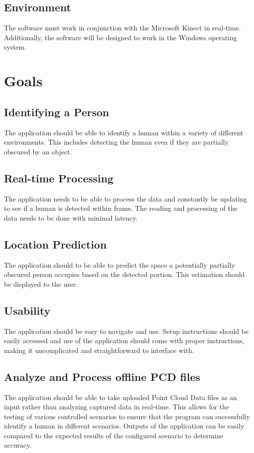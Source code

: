 \documentclass{article}
\begin{document}
\subsection{Environment}
The software must work in conjunction with the Microsoft Kinect in real-time. Additionally, the software will be designed to work in the Windows operating system.

\newpage
\section{Goals}   

\subsection{Identifying a Person}
The application should be able to identify a human within a variety of different environments. This includes detecting the human even if they are partially obscured by an object.

\subsection{Real-time Processing}
The application needs to be able to process the data and constantly be updating to see if a human is detected within frame. The reading and processing of the data needs to be done with minimal latency.

\subsection{Location Prediction}
The application should to be able to predict the space a potentially partially obscured person occupies based on the detected portion. This estimation should be displayed to the user.

\subsection{Usability}
The application should be easy to navigate and use. Setup instructions should be easily accessed and use of the application should come with proper instructions, making it uncomplicated and straightforward to interface with.

\subsection{Analyze and Process offline PCD files}
The application should be able to take uploaded Point Cloud Data files as an input rather than analyzing captured data in real-time. This allows for the testing of various controlled scenarios to ensure that the program can successfully identify a human in different scenarios. Outputs of the application can be easily compared to the expected results of the configured scenario to determine accuracy.
        
\end{document}
